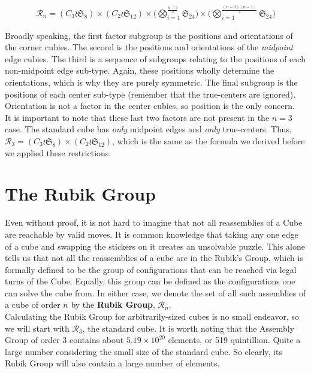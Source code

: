 \documentclass[10pt,letterpaper]{report}
\begin{document}
\begin{align*}
\mathcal{R}_n = (C_3 \wr \mathfrak{S}_8) \times (C_2 \wr \mathfrak{S}_{12}) \times \Big( \bigotimes_{i=1}^{\frac{n-3}{2}}\mathfrak{S}_{24} \Big) \times \Big( \bigotimes_{i=1}^{\frac{(n-3)(n-1)}{4}}\mathfrak{S}_{24} \Big)
\end{align*}

Broadly speaking, the first factor subgroup is the positions and orientations of the corner cubies.  The second is the positions and orientations of the \textit{midpoint} edge cubies.  The third is a sequence of subgroups relating to the positions of each non-midpoint edge sub-type.  Again, these positions wholly determine the orientations, which is why they are purely symmetric.  The final subgroup is the positions of each center sub-type (remember that the true-centers are ignored).  Orientation is not a factor in the center cubies, so position is the only concern. \\

It is important to note that these last two factors are not present in the $n=3$ case.  The standard cube has \textit{only} midpoint edges and \textit{only} true-centers.  Thus, $\mathcal{R}_3 = (C_3 \wr \mathfrak{S}_8) \times (C_2 \wr \mathfrak{S}_{12})$, which is the same as the formula we derived before we applied these restrictions.

\section{The Rubik Group}
Even without proof, it is not hard to imagine that not all reassemblies of a Cube are reachable by valid moves.  It is common knowledge that taking any one edge of a cube and swapping the stickers on it creates an unsolvable puzzle.  This alone tells us that not all the reassemblies of a cube are in the Rubik's Group, which is formally defined to be the group of configurations that can be reached via legal turns of the Cube.  Equally, this group can be defined as the configurations one can solve the cube from.  In either case, we denote the set of all such assemblies of a cube of order $n$ by the \textbf{Rubik Group}, $\mathcal{R}_n$.  \\

Calculating the Rubik Group for arbitrarily-sized cubes is no small endeavor, so we will start with $\mathcal{R}_3$, the standard cube.  It is worth noting that the Assembly Group of order 3 contains about $5.19 \times 10^{20}$ elements, or 519 quintillion.  Quite a large number considering the small size of the standard cube.  So clearly, its Rubik Group will also contain a large number of elements. \\
\end{document}
